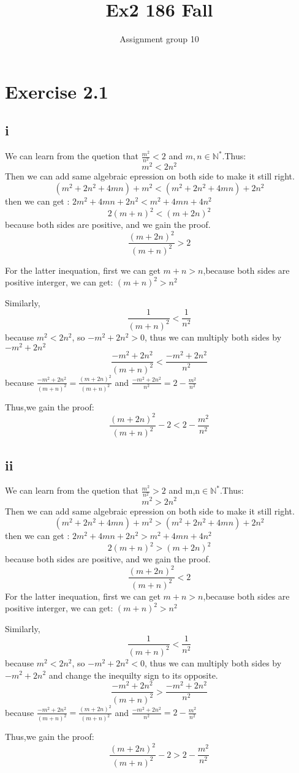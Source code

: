 \documentclass[11pt,twoside,a4paper]{article}
\begin{document}
\title{Ex2 186 Fall}
\author{Assignment group 10}
\date{}
\maketitle
\section{Exercise 2.1}
\subsection{i}
We can learn from the quetion that $\displaystyle \frac{m^2}{n^2}<2$ and $m,n\in\mathbb{N}^*$.Thus:
$$m^2<2n^2$$
Then we can add same algebraic epression on both side to make it still right.
$$(m^2+2n^2+4mn)+m^2<(m^2+2n^2+4mn)+2n^2$$
then we can get :    
$2m^2+4mn+2n^2<m^2+4mn+4n^2$
$$2(m+n)^2<(m+2n)^2$$
because both sides are positive, and we gain the proof.
\[\frac{(m+2n)^2}{(m+n)^2}>2\]\par
For the latter  inequation, first we can get $m+n>n$,because both sides are positive interger, we can get:
$(m+n)^2>n^2$ \par
Similarly, 
$$\frac{1}{(m+n)^2}<\frac{1}{n^2}$$
because $m^2<2n^2$, so $-m^2+2n^2>0$, thus we can multiply both sides by $-m^2+2n^2$ 
$$\frac{-m^2+2n^2}{(m+n)^2}<\frac{-m^2+2n^2}{n^2}$$
because $\displaystyle\frac{-m^2+2n^2}{(m+n)^2}=\frac{(m+2n)^2}{(m+n)^2}$ and $\displaystyle\frac{-m^2+2n^2}{n^2}=2-\frac{m^2}{n^2}$\par
Thus,we gain the proof:$$\displaystyle\frac{(m+2n)^2}{(m+n)^2}-2<2-\frac{m^2}{n^2}$$



\subsection{ii}
We can learn from the quetion that $\displaystyle\frac{m^2}{n^2}>2$ and m,n$\in\mathbb{N}^*$.Thus:
$$m^2>2n^2$$
Then we can add same algebraic epression on both side to make it still right.
$$(m^2+2n^2+4mn)+m^2>(m^2+2n^2+4mn)+2n^2$$
then we can get :    
$2m^2+4mn+2n^2>m^2+4mn+4n^2$
$$2(m+n)^2>(m+2n)^2$$
because both sides are positive, and we gain the proof.
\[\frac{(m+2n)^2}{(m+n)^2}<2\]
For the latter  inequation, first we can get $m+n>n$,because both sides are positive interger, we can get:
$(m+n)^2>n^2$ \par
Similarly, 
$$\frac{1}{(m+n)^2}<\frac{1}{n^2}$$
because $m^2<2n^2$, so $-m^2+2n^2<0$, thus we can multiply both sides by $-m^2+2n^2$ and change the inequilty sign to its opposite.
$$\frac{-m^2+2n^2}{(m+n)^2}>\frac{-m^2+2n^2}{n^2}$$
because $\displaystyle\frac{-m^2+2n^2}{(m+n)^2}=\frac{(m+2n)^2}{(m+n)^2}$ and $\displaystyle\frac{-m^2+2n^2}{n^2}=2-\frac{m^2}{n^2}$\par
Thus,we gain the proof:$$\displaystyle\frac{(m+2n)^2}{(m+n)^2}-2>2-\frac{m^2}{n^2}$$
\end{document}
